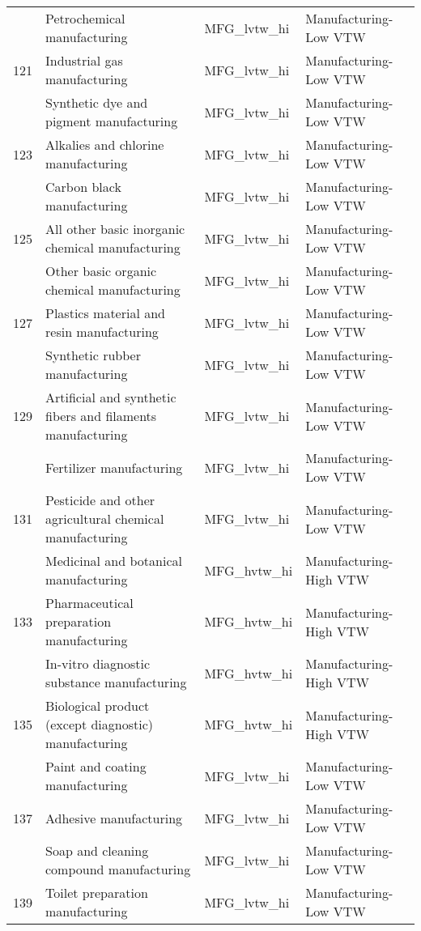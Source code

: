 \begin{landscape}
\begin{small}
\begin{longtable}{clll}
\gray 120 & Petrochemical manufacturing & MFG\_lvtw\_hi & Manufacturing-Low VTW \\
121 & Industrial gas manufacturing & MFG\_lvtw\_hi & Manufacturing-Low VTW \\
\gray 122 & Synthetic dye and pigment manufacturing & MFG\_lvtw\_hi & Manufacturing-Low VTW \\
123 & Alkalies and chlorine manufacturing & MFG\_lvtw\_hi & Manufacturing-Low VTW \\
\gray 124 & Carbon black manufacturing & MFG\_lvtw\_hi & Manufacturing-Low VTW \\
125 & All other basic inorganic chemical manufacturing & MFG\_lvtw\_hi & Manufacturing-Low VTW \\
\gray 126 & Other basic organic chemical manufacturing & MFG\_lvtw\_hi & Manufacturing-Low VTW \\
127 & Plastics material and resin manufacturing & MFG\_lvtw\_hi & Manufacturing-Low VTW \\
\gray 128 & Synthetic rubber manufacturing & MFG\_lvtw\_hi & Manufacturing-Low VTW \\
129 & Artificial and synthetic fibers and filaments manufacturing & MFG\_lvtw\_hi & Manufacturing-Low VTW \\
\gray 130 & Fertilizer manufacturing & MFG\_lvtw\_hi & Manufacturing-Low VTW \\
131 & Pesticide and other agricultural chemical manufacturing & MFG\_lvtw\_hi & Manufacturing-Low VTW \\
\gray 132 & Medicinal and botanical manufacturing & MFG\_hvtw\_hi & Manufacturing-High VTW \\
133 & Pharmaceutical preparation manufacturing & MFG\_hvtw\_hi & Manufacturing-High VTW \\
\gray 134 & In-vitro diagnostic substance manufacturing & MFG\_hvtw\_hi & Manufacturing-High VTW \\
135 & Biological product (except diagnostic) manufacturing & MFG\_hvtw\_hi & Manufacturing-High VTW \\
\gray 136 & Paint and coating manufacturing & MFG\_lvtw\_hi & Manufacturing-Low VTW \\
137 & Adhesive manufacturing & MFG\_lvtw\_hi & Manufacturing-Low VTW \\
\gray 138 & Soap and cleaning compound manufacturing & MFG\_lvtw\_hi & Manufacturing-Low VTW \\
139 & Toilet preparation manufacturing & MFG\_lvtw\_hi & Manufacturing-Low VTW \\

\end{longtable}
\end{small}
\end{landscape}
